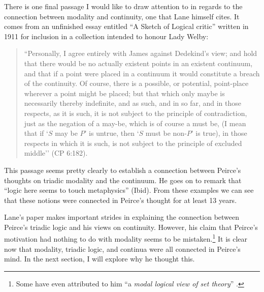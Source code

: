 There is one final passage I would like to draw attention to in regards to the connection between modality and continuity, one that Lane himself cites. It comes from an unfinished essay entitled ``A Sketch of Logical critic'' written in 1911 for inclusion in a collection intended to honour Lady Welby: 
\begin{quotation}
``Personally, I agree entirely with James against Dedekind's view; and hold that there would be no actually existent points in an existent continuum, and that if a point were placed in a continuum it would constitute a breach of the continuity. Of course, there is a possible, or potential, point-place wherever a point might be placed; but that which only maybe is necessarily thereby indefinite, and as such, and in so far, and in those respects, as it is such, it is not subject to the principle of contradiction, just as the negation of a may-be, which is of course a must be, (I mean that if `$S$ may be $P$’ is untrue, then `$S$ must be non-$P$’ is true), in those respects in which it is such, is not subject to the principle of excluded middle'' (CP 6:182).
\end{quotation}
\noindent This passage seems pretty clearly to establish a connection between Peirce's thoughts on triadic modality and the continuum. He goes on to remark that ``logic here seems to touch metaphysics'' (Ibid). From these examples we can see that these notions were connected in Peirce's thought for at least 13 years.
 
Lane's paper makes important strides in explaining the connection between Peirce's triadic logic and his views on continuity. However, his claim that Peirce's motivation had nothing to do with modality seems to be mistaken.\footnote{Some have even attributed to him ``a \textit{modal logical view of set theory}'' \citep{Putnam1995-PUT}.} It is clear now that modality, triadic logic, and continua were all connected in Peirce's mind. In the next section, I will explore why he thought this.
